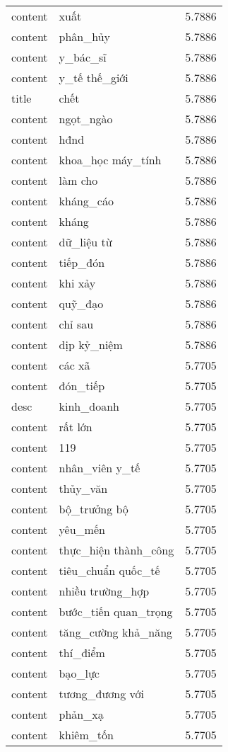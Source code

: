\documentclass{article}
\begin{document}
\begin{tabular}{lll}
content & xuất & 5.7886\\
content & phân\_hủy & 5.7886\\
content & y\_bác\_sĩ & 5.7886\\
content & y\_tế thế\_giới & 5.7886\\
title & chết & 5.7886\\
content & ngọt\_ngào & 5.7886\\
content & hđnd & 5.7886\\
content & khoa\_học máy\_tính & 5.7886\\
content & làm cho & 5.7886\\
content & kháng\_cáo & 5.7886\\
content & kháng & 5.7886\\
content & dữ\_liệu từ & 5.7886\\
content & tiếp\_đón & 5.7886\\
content & khi xảy & 5.7886\\
content & quỹ\_đạo & 5.7886\\
content & chỉ sau & 5.7886\\
content & dịp kỷ\_niệm & 5.7886\\
content & các xã & 5.7705\\
content & đón\_tiếp & 5.7705\\
desc & kinh\_doanh & 5.7705\\
content & rất lớn & 5.7705\\
content & 119 & 5.7705\\
content & nhân\_viên y\_tế & 5.7705\\
content & thủy\_văn & 5.7705\\
content & bộ\_trưởng bộ & 5.7705\\
content & yêu\_mến & 5.7705\\
content & thực\_hiện thành\_công & 5.7705\\
content & tiêu\_chuẩn quốc\_tế & 5.7705\\
content & nhiều trường\_hợp & 5.7705\\
content & bước\_tiến quan\_trọng & 5.7705\\
content & tăng\_cường khả\_năng & 5.7705\\
content & thí\_điểm & 5.7705\\
content & bạo\_lực & 5.7705\\
content & tương\_đương với & 5.7705\\
content & phản\_xạ & 5.7705\\
content & khiêm\_tốn & 5.7705\\

\end{tabular}
\end{document}
